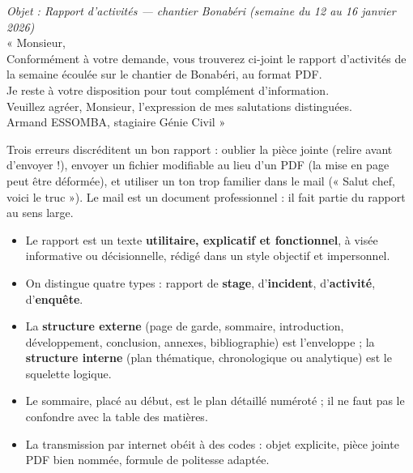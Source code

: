 \documentclass[11pt]{article}
\begin{document}
\begin{exemplebox}
\emph{Objet : Rapport d'activités — chantier Bonabéri (semaine du 12 au 16 janvier 2026)}\\
« Monsieur,\\
Conformément à votre demande, vous trouverez ci-joint le rapport d'activités de la semaine écoulée sur le chantier de Bonabéri, au format PDF.\\
Je reste à votre disposition pour tout complément d'information.\\
Veuillez agréer, Monsieur, l'expression de mes salutations distinguées.\\
Armand ESSOMBA, stagiaire Génie Civil »
\end{exemplebox}

\begin{attention}
Trois erreurs discréditent un bon rapport : oublier la pièce jointe (relire avant d'envoyer !), envoyer un fichier modifiable au lieu d'un PDF (la mise en page peut être déformée), et utiliser un ton trop familier dans le mail (« Salut chef, voici le truc »). Le mail est un document professionnel : il fait partie du rapport au sens large.
\end{attention}

\begin{aretenir}
\begin{itemize}
\item Le rapport est un texte \textbf{utilitaire, explicatif et fonctionnel}, à visée informative ou décisionnelle, rédigé dans un style objectif et impersonnel.
\item On distingue quatre types : rapport de \textbf{stage}, d'\textbf{incident}, d'\textbf{activité}, d'\textbf{enquête}.
\item La \textbf{structure externe} (page de garde, sommaire, introduction, développement, conclusion, annexes, bibliographie) est l'enveloppe ; la \textbf{structure interne} (plan thématique, chronologique ou analytique) est le squelette logique.
\item Le sommaire, placé au début, est le plan détaillé numéroté ; il ne faut pas le confondre avec la table des matières.
\item La transmission par internet obéit à des codes : objet explicite, pièce jointe PDF bien nommée, formule de politesse adaptée.
\end{itemize}
\end{aretenir}
\end{document}
